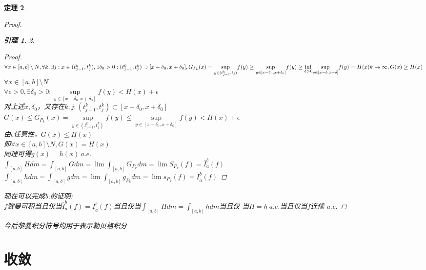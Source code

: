 \documentclass[12pt, a4paper, oneside]{ctexbook}
\newtheorem{theorem}{定理}[section]
\newtheorem{lemma}[theorem]{引理}
\begin{document}
\begin{theorem}
\begin{proof}
\begin{lemma}{2.}
\begin{proof}
                $\forall x\in[a,b]\setminus N,\forall k,\exists j:x\in(t_{j-1}^k,t_j^k),\exists \delta_0>0:(t_{j-1}^k,t_j^k)\supset [x-\delta_0,x+
                \delta_0],G_{P_k}(x)=\underset{y\in(t_{j-1}^k,t_j)}{\sup}f(y)\geq\underset{y\in[x-\delta_0,x+\delta_0]}{\sup}f(y)\geq \underset{\delta>0}{\inf}\underset{y\in[x-\delta,x+\delta]}{\sup}f(y)=H(x)
                \\k\to\infty,G(x)\geq H(x)$
                \\$\forall x\in[a,b]\setminus N$
                \\$\forall \epsilon>0,\exists \delta_0>0:\underset{y\in[x-\delta_0,x+\delta_0]}{\sup}f(y)<H(x)+\epsilon$
                \\对上述$x,\delta_0$，又存在$k,j:(t_{j-1}^k,t_j^k)\subset[x-\delta_0,x+\delta_0]$
                \\$G(x)\leq G_{P_k}(x)=\underset{y\in(t_{j-1}^k,t_j^k)}{\sup}f(y)\leq\underset{y\in[x-\delta_0,x+\delta_0]}{\sup}f(y)<H(x)+\epsilon$
                \\由$\epsilon$任意性，$G(x)\leq H(x)$
                \\即$\forall x\in[a,b]\setminus N,G(x)=H(x)$
                \\同理可得$g(x)=h(x)\ a.e.$
                \\$\int_{[a,b]}Hdm=\int_{[a,b]}Gdm=\lim\int_{[a,b]}G_{P_k}dm=\lim S_{P_k}(f)=\overline{I}_a^b(f)$
                \\$\int_{[a,b]}hdm=\int_{[a,b]}gdm=\lim\int_{[a,b]}g_{P_k}dm=\lim s_{P_k}(f)=\underline{I}_a^b(f)$
            \end{proof}
        \end{lemma}
    现在可以完成b.的证明:
    \\$f$黎曼可积当且仅当$\overline{I}_a^b(f)=\underline{I}_a^b(f)$当且仅当$\int_{[a,b]}Hdm=\int_{[a,b]}hdm$当且仅
    当$H=h\ a.e.$当且仅当$f$连续 a.e.
    \end{proof}
今后黎曼积分符号均用于表示勒贝格积分
\end{theorem}

\section{收敛}
\end{document}

